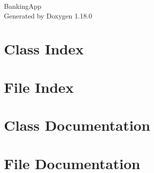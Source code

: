 \documentclass[twoside]{book}
\newcommand{\+}{\discretionary{\mbox{\scriptsize$\hookleftarrow$}}{}{}}
\newcommand{\clearemptydoublepage}{%
    \newpage{\pagestyle{empty}\cleardoublepage}%
  }
\begin{document}
  \raggedbottom
    \hypersetup{pageanchor=false,
                bookmarksnumbered=true,
                pdfencoding=unicode
               }
  \begin{titlepage}
  \vspace*{7cm}
  \begin{center}%
  {\Large Banking\+App}\\
  \vspace*{1cm}
  {\large Generated by Doxygen 1.18.0}\\
  \end{center}
  \end{titlepage}
  \clearemptydoublepage
  \tableofcontents
  \clearemptydoublepage
  \hypersetup{pageanchor=true}

\chapter{Class Index}

\chapter{File Index}

\chapter{Class Documentation}

\chapter{File Documentation}

  \backmatter
  \newpage
  \clearemptydoublepage
  \printindex
\end{document}
